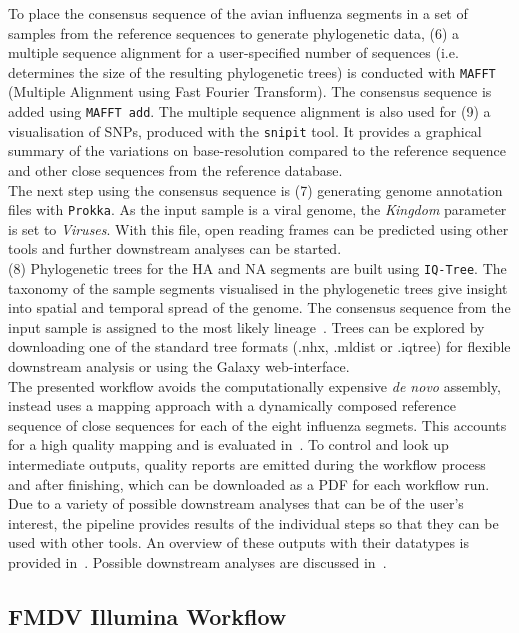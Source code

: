 To place the consensus sequence of the avian influenza segments in a set of samples from the reference sequences to generate phylogenetic data, (6) a multiple sequence alignment for a user-specified number of sequences (i.e. determines the size of the resulting phylogenetic trees) is conducted with \texttt{MAFFT} (Multiple Alignment using Fast Fourier Transform). The consensus sequence is added using \texttt{MAFFT add}. The multiple sequence alignment is also used for (9) a visualisation of SNPs, produced with the \texttt{snipit} tool. It provides a graphical summary of the variations on base-resolution compared to the reference sequence and other close sequences from the reference database. \\
The next step using the consensus sequence is (7) generating genome annotation files with \texttt{Prokka}. As the input sample is a viral genome, the \textit{Kingdom} parameter is set to \textit{Viruses}. With this file, open reading frames can be predicted using other tools and further downstream analyses can be started. \\
(8) Phylogenetic trees for the \ac{HA} and \ac{NA} segments are built using \texttt{IQ-Tree}. The taxonomy of the sample segments visualised in the phylogenetic trees give insight into spatial and temporal spread of the genome. The consensus sequence from the input sample is assigned to the most likely lineage~\cite{minh2020iq}. Trees can be explored by downloading one of the standard tree formats (.nhx, .mldist or .iqtree) for flexible downstream analysis or using the Galaxy web-interface. \\
The presented workflow avoids the computationally expensive \textit{de novo} assembly, instead uses a mapping approach with a dynamically composed reference sequence of close sequences for each of the eight influenza segmets. This accounts for a high quality mapping and is evaluated in~. To control and look up intermediate outputs, quality reports are emitted during the workflow process and after finishing, which can be downloaded as a \ac{PDF} for each workflow run. \\
Due to a variety of possible downstream analyses that can be of the user's interest, the pipeline provides results of the individual steps so that they can be used with other tools. An overview of these outputs with their datatypes is provided in~. Possible downstream analyses are discussed in~.

\subsection{FMDV Illumina Workflow}\label{sec:fmdv-wf}

